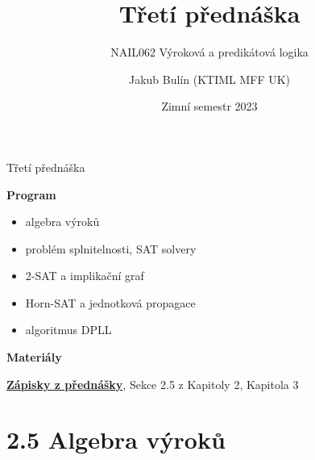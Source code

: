 \documentclass{beamer}
\title{Třetí přednáška}
\subtitle{NAIL062 Výroková a predikátová logika}
\author{Jakub Bulín (KTIML MFF UK)}
\date{Zimní semestr 2023}
\begin{document}
\maketitle


\begin{frame}{Třetí přednáška}

    \textbf{Program}
        \begin{itemize}
            \item algebra výroků
            \item problém splnitelnosti, SAT solvery
            \item 2-SAT a implikační graf
            \item Horn-SAT a jednotková propagace
            \item algoritmus DPLL
        \end{itemize}

    \textbf{Materiály}

        \href{https://github.com/jbulin-mff-uk/nail062/raw/main/lecture/lecture-notes/lecture-notes.pdf}{\alert{\textbf{Zápisky z přednášky}}}, Sekce 2.5 z Kapitoly 2, Kapitola 3

\end{frame}


\section{2.5 Algebra výroků}
\end{document}
